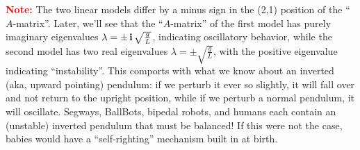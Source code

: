 \begin{enumerate}
\textcolor{red}{\bf Note:} The two linear models differ by a minus sign in the (2,1) position of the ``$A$-matrix''. Later, we'll see that the ``$A$-matrix'' of the first model has purely imaginary eigenvalues $\lambda = \pm \mathop{\bm{\mathrm i}} \sqrt{\frac{g}{L}}$, indicating oscillatory behavior, while the second model has two real eigenvalues $\lambda = \pm \sqrt{\frac{g}{L}}$, with the positive eigenvalue indicating ``instability''. This comports with what we know about an inverted (aka, upward pointing) pendulum: if we perturb it ever so slightly, it will fall over and not return to the upright position, while if we perturb a normal pendulum, it will oscillate. Segways, BallBots, bipedal robots, and humans each contain an (unstable) inverted pendulum that must be balanced! If this were not the case, babies would have a ``self-righting'' mechanism built in at birth. 
\end{enumerate} 
\Qed

  \bigskip

